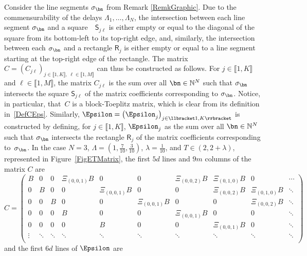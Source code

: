 \begin{remk}
Consider the line segments $\sigma_{\bn}$ from Remark \ref{RemkGraphic}. Due to the commensurability of the delays $\Lambda_1, \dots, \Lambda_N$, the intersection between each line segment $\sigma_{\bn}$ and a square~ $\mathsf S_{j\ell}$ is either empty or equal to the diagonal of the square from its bottom-left to its top-right edge, and, similarly, the intersection between each $\sigma_{\bn}$ and a rectangle $\mathsf R_j$ is either empty or equal to a line segment starting at the top-right edge of the rectangle. The matrix $C = \left(C_{j\ell}\right)_{j \in \llbracket 1, K\rrbracket,\; \ell \in \llbracket 1, M\rrbracket}$ can thus be constructed as follows. For \hbox{$j \in \llbracket 1, K\rrbracket$} and $\ell \in \llbracket 1, M\rrbracket$, the matrix $C_{j\ell}$ is the sum over all $\bn \in \mathbb N^N$ such that $\sigma_{\bn}$ intersects the square $\mathsf S_{j\ell}$ of the matrix coefficients corresponding to $\sigma_{\bn}$. Notice, in particular, that~$C$ is a block-Toeplitz matrix, which is clear from its definition in~\eqref{DefCEps}. Similarly, $\Epsilon = \left(\Epsilon_j\right)_{j \in \llbracket 1, K\rrbracket}$ is constructed by defining, for $j \in \llbracket 1, K\rrbracket$, $\Epsilon_j$ as the sum over all \hbox{$\bn \in \mathbb N^N$} such that $\sigma_{\bn}$ intersects the rectangle $\mathsf R_{j}$ of the matrix coefficients corresponding to~$\sigma_{\bn}$. In the case $N = 3$, $\Lambda = \left(1, \frac{7}{10}, \frac{3}{10}\right)$, $\lambda = \frac{1}{10}$, and $T \in (2, 2 + \lambda)$, represented in Figure~\ref{FigETMatrix}, the first $5d$ lines and $9m$ columns of the matrix $C$ are
\begin{equation*}
C =
\begin{pmatrix}
B & 0 & 0 & \Xi_{(0, 0, 1)} B & 0 & 0 & \Xi_{(0, 0, 2)} B & \Xi_{(0, 1, 0)} B & 0 & \cdots \\
0 & B & 0 & 0 & \Xi_{(0, 0, 1)} B & 0 & 0 & \Xi_{(0, 0, 2)} B & \Xi_{(0, 1, 0)} B & \ddots \\
0 & 0 & B & 0 & 0 & \Xi_{(0, 0, 1)} B & 0 & 0 & \Xi_{(0, 0, 2)} B & \ddots \\
0 & 0 & 0 & B & 0 & 0 & \Xi_{(0, 0, 1)} B & 0 & 0 & \ddots \\
0 & 0 & 0 & 0 & B & 0 & 0 & \Xi_{(0, 0, 1)} B & 0 & \ddots \\
\vdots & \ddots & \ddots & \ddots & \ddots & \ddots & \ddots & \ddots & \ddots & \ddots \\
\end{pmatrix}
\end{equation*}
and the first $6d$ lines of $\Epsilon$ are

\end{remk}
